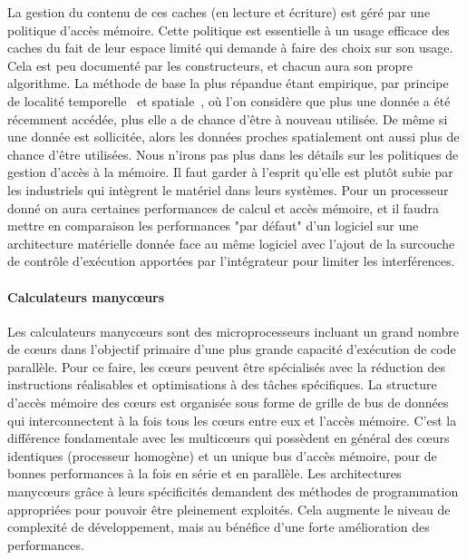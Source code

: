 \documentclass[french, a4paper, 11pt, twoside, pdftex]{StyleThese}
\begin{document}
		La gestion du contenu de ces caches (en lecture et écriture) est géré par une politique d'accès mémoire. Cette politique est essentielle à un usage efficace des caches du fait de leur espace limité qui demande à faire des choix sur son usage. Cela est peu documenté par les constructeurs, et chacun aura son propre algorithme.
		La méthode de base la plus répandue étant empirique, par principe de localité temporelle~\cite{durrieu_predictable_2014} et spatiale~\cite{wilkes_slave_1965}, où l'on considère que plus une donnée a été récemment accédée, plus elle a de chance d'être à nouveau utilisée. De même si une donnée est sollicitée, alors les données proches spatialement ont aussi plus de chance d'être utilisées. 
		Nous n'irons pas plus dans les détails sur les politiques de gestion d'accès à la mémoire. Il faut garder à l'esprit qu'elle est plutôt subie par les industriels qui intègrent le matériel dans leurs systèmes. Pour un processeur donné on aura certaines performances de calcul et accès mémoire, et il faudra mettre en comparaison les performances "par défaut" d'un logiciel sur une architecture matérielle donnée face au même logiciel avec l'ajout de la surcouche de contrôle d'exécution apportées par l'intégrateur pour limiter les interférences.


		\paragraph{Calculateurs manycœurs}	Les calculateurs manycœurs sont des microprocesseurs incluant un grand nombre de cœurs dans l'objectif primaire d'une plus grande capacité d'exécution de code parallèle. Pour ce faire, les cœurs peuvent être spécialisés avec la réduction des instructions réalisables et optimisations à des tâches spécifiques. La structure d'accès mémoire des cœurs est organisée sous forme de grille de bus de données qui interconnectent à la fois tous les cœurs entre eux et l'accès mémoire. C'est la différence fondamentale avec les multicœurs qui possèdent en général des cœurs identiques (processeur homogène) et un unique bus d'accès mémoire, pour de bonnes performances à la fois en série et en parallèle. 
		Les architectures manycœurs grâce à leurs spécificités demandent  des méthodes de programmation appropriées pour pouvoir être pleinement exploités. Cela augmente le niveau de complexité de développement, mais au bénéfice d'une forte amélioration des performances.
		
\end{document}
